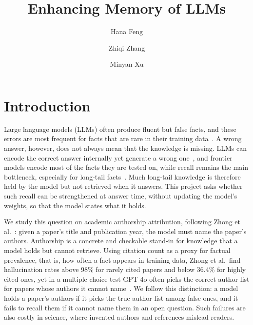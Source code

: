 \documentclass[sigconf,nonacm]{acmart}
\begin{document}
 
\title{Enhancing Memory of LLMs}
 
\author{Hana Feng}
 
 
\author{Zhiqi Zhang}
\authornotemark[1]
 
 
\author{Minyan Xu}
\authornotemark[1]
 
\maketitle
 
\section{Introduction}
Large language models (LLMs) often produce fluent but false facts, and these errors are most frequent for facts that are rare in their training data~\cite{kandpal2023longtail,mallen2023popqa}. A wrong answer, however, does not always mean that the knowledge is missing. LLMs can encode the correct answer internally yet generate a wrong one~\cite{orgad2025knowmore,gekhman2025insideout}, and frontier models encode most of the facts they are tested on, while recall remains the main bottleneck, especially for long-tail facts~\cite{calderon2026emptyshelves}. Much long-tail knowledge is therefore held by the model but not retrieved when it answers. This project asks whether such recall can be strengthened at answer time, without updating the model's weights, so that the model states what it holds.

We study this question on academic authorship attribution, following Zhong et al.~\cite{zhong2026dreaming}: given a paper's title and publication year, the model must name the paper's authors. Authorship is a concrete and checkable stand-in for knowledge that a model holds but cannot retrieve. Using citation count as a proxy for factual prevalence, that is, how often a fact appears in training data, Zhong et al.\ find hallucination rates above 98\% for rarely cited papers and below 36.4\% for highly cited ones, yet in a multiple-choice test GPT-4o often picks the correct author list for papers whose authors it cannot name~\cite{zhong2026dreaming}. We follow this distinction: a model holds a paper's authors if it picks the true author list among false ones, and it fails to recall them if it cannot name them in an open question. Such failures are also costly in science, where invented authors and references mislead readers.
\end{document}
